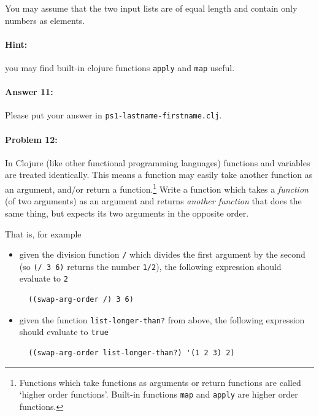 \documentclass[10pt]{article}
\newcommand{\required}[1]{{\color{blue}{#1}}}
\newcommand{\PSnum}{1}
\begin{document}
You may assume that the two input lists are of equal length and contain only
numbers as elements.

\paragraph*{Hint:} you may find built-in clojure functions \texttt{apply} and
\texttt{map} useful.

\paragraph{Answer 11:} Please put your answer in
\texttt{ps\PSnum-lastname-firstname.clj}.

\noindent\hrulefill%

\paragraph{Problem 12:} In Clojure (like other functional programming languages)
functions and variables are treated identically. This means a function may
easily take another function as an argument, and/or return a
function.\footnote{Functions which take functions as arguments or return
  functions are called `higher order functions'. Built-in functions \texttt{map}
and \texttt{apply} are higher order functions.} Write a function
\required{\texttt{swap-arg-order}} which takes a \emph{function} (of two
arguments) as an argument and returns \emph{another function} that does the same
thing, but expects its two arguments in the opposite order.

That is, for example
\begin{itemize}[nosep]
  \item given the division function \texttt{/} which divides the first argument
    by the second (so \texttt{(/ 3 6)} returns the number \texttt{1/2}), the
    following expression should evaluate to \texttt{2}
    \begin{lstlisting}
  ((swap-arg-order /) 3 6)
    \end{lstlisting}
  \item given the function \texttt{list-longer-than?} from above, the following
    expression should evaluate to \texttt{true}
    \begin{lstlisting}
  ((swap-arg-order list-longer-than?) '(1 2 3) 2)
    \end{lstlisting}
\end{itemize}
\end{document}
